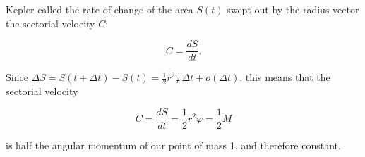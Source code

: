 Kepler called the rate of change of the area $S(t)$ swept out by the radius vector the sectorial velocity $C$:

$$C = \frac{dS}{dt}.$$

Since $\Delta S = S(t + \Delta t) - S(t) = \frac{1}{2} r^2 \dot{\varphi} \Delta t + o(\Delta t)$, this means that the sectorial velocity

$$C = \frac{dS}{dt} = \frac{1}{2} r^2 \dot{\varphi} = \frac{1}{2} M$$

is half the angular momentum of our point of mass 1, and therefore constant.
